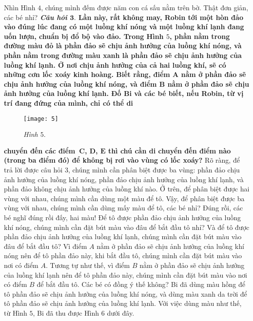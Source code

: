 	Nhìn Hình $4$, chúng mình đếm được năm con cá sấu nằm trên bờ. Thật đơn giản, các bé nhỉ?
	\vskip 0.1cm
	\textbf{\textit{Câu hỏi $\pmb{3.}$} {\color{abc}Lần này, rất không may, Robin tới một hòn đảo vào đúng lúc đang có một luồng khí nóng và một luồng khí lạnh đang uốn lượn, chuẩn bị đổ bộ vào đảo. Trong  Hình $5$, phần nằm trong đường màu đỏ là phần đảo sẽ chịu ảnh hưởng của luồng khí nóng, và phần nằm trong đường màu xanh là phần đảo sẽ chịu ảnh hưởng của luồng khí lạnh. Ở nơi chịu ảnh hưởng của cả hai luồng khí, sẽ có những cơn lốc xoáy kinh hoàng. Biết rằng, điểm $\pmb A$ nằm ở phần đảo sẽ chịu ảnh hưởng của luồng khí nóng, và điểm $\pmb B$ nằm ở phần đảo sẽ chịu ảnh hưởng của luồng khí lạnh. Đố Bi và các bé biết, nếu Robin, từ vị trí đang đứng của mình, chỉ có thể di}}
	\begin{figure}
		\vspace*{-5pt}
		\centering
		\captionsetup{labelformat=empty, justification=centering}
		\texttt{[image: 5]}
		\caption{\textit{\small Hình $5.$}}
		\vspace*{-15pt}
	\end{figure}
	\textbf{{\color{abc}chuyển đến các điểm~$\pmb C$, $\pmb D$, $\pmb E$ thì chú cần di chuyển đến điểm nào (trong ba điểm đó) để không bị rơi vào vùng có  lốc xoáy?}}
	\vskip 0.1cm
	Rõ ràng, để trả lời được câu hỏi $3$, chúng mình cần phân biệt được ba vùng: phần đảo chịu ảnh hưởng của luồng khí nóng, phần đảo chịu ảnh hưởng của luồng khí lạnh, và phần đảo không chịu ảnh hưởng của luồng khí nào.
	\vskip 0.1cm
	Ở trên, để phân biệt được hai vùng với nhau, chúng mình cần dùng một màu để tô. Vậy, để phân biệt được ba vùng với nhau, chúng mình cần dùng mấy màu để tô, các bé nhỉ? Đúng rồi, các bé nghĩ đúng rồi đấy, hai màu! Để tô được phần đảo chịu ảnh hưởng của luồng khí nóng, chúng mình cần đặt bút màu vào đâu để bắt đầu tô nhỉ? Và để tô được phần đảo chịu ảnh hưởng của luồng khí lạnh, chúng mình cần đặt bút màu vào đâu để bắt đầu tô? Vì điểm $A$ nằm ở phần đảo sẽ chịu ảnh hưởng của luồng khí nóng nên để tô phần đảo này, khi bắt đầu tô, chúng  mình cần đặt bút màu vào nơi có điểm $A$. Tương tự như thế, vì điểm $B$ nằm ở phần đảo sẽ chịu ảnh hưởng của luồng khí lạnh nên để tô phần đảo này, chúng mình cần đặt bút màu vào nơi có điểm $B$ để bắt đầu tô. Các bé có đồng ý  thế không?
	\vskip 0.05cm
	Bi đã dùng màu hồng để tô phần đảo sẽ chịu ảnh hưởng của luồng khí nóng, và dùng màu xanh da trời để tô phần đảo sẽ chịu ảnh hưởng của luồng khí lạnh. Với việc dùng màu như thế, từ Hình $5$, Bi đã thu được Hình $6$ dưới đây.
	\vskip 0.1cm

